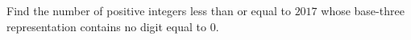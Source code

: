 Find the number of positive integers less than or equal to $2017$ whose base-three representation contains no digit equal to $0$.